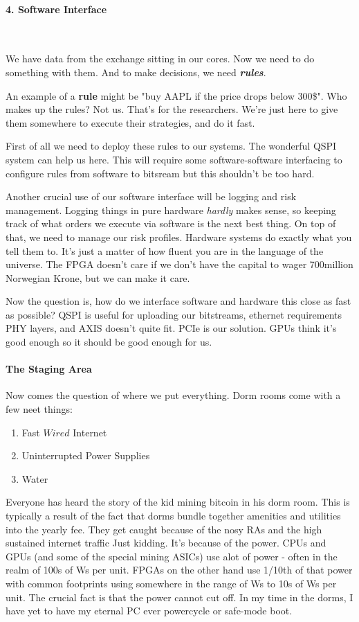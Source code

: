 \documentclass[12pt]{article}
\begin{document}
\paragraph {4. Software Interface}\

We have data from the exchange sitting in our cores. Now we need to do something with them. 
And to make decisions, we need \textbf{\emph{rules}}.

An example of a \textbf{rule} might be "buy AAPL if the price drops below 300\$". 
Who makes up the rules? Not us. That's for the researchers. We're just here to give them 
somewhere to execute their strategies, and do it fast.

First of all we need to deploy these rules to our systems. The wonderful QSPI system can help us here. 
This will require some software-software interfacing to configure rules from software to bitsream
but this shouldn't be too hard.


Another crucial use of our software interface will be logging and risk management.
Logging things in pure hardware \emph{hardly} makes sense, so keeping track of what 
orders we execute via software is the next best thing. 
On top of that, we need to manage our risk profiles. 
Hardware systems do exactly what you tell them to. It's just a matter of how fluent you are in the language of the universe.
The FPGA doesn't care if we don't have the capital to wager 700million Norwegian Krone, but we can make it care.

Now the question is, how do we interface software and hardware this close as fast as possible? 
QSPI is useful for uploading our bitstreams, ethernet requirements PHY layers, and AXIS doesn't quite fit. 
PCIe is our solution. GPUs think it's good enough so it should be good enough for us.

\paragraph{The Staging Area}

Now comes the question of where we put everything. 
Dorm rooms come with a few neet things:
\begin{enumerate}
  \item
    Fast \(Wired\) Internet
  \item
    Uninterrupted Power Supplies
  \item
    Water

\end{enumerate}
Everyone has heard the story of the kid mining bitcoin in his dorm room. 
This is typically a result of the fact that dorms bundle together amenities and utilities into the yearly fee.
They get caught because of the nosy RAs and the high sustained internet traffic 
Just kidding. It's because of the power. CPUs and GPUs (and some of the special mining ASICs) use alot of power -
often in the realm of 100s of Ws per unit. FPGAs on the other hand use 1/10th of that power with common footprints 
using somewhere in the range of Ws to 10s of Ws per unit. The crucial fact is that the power cannot cut off. 
In my time in the dorms, I have yet to have my eternal PC ever powercycle or safe-mode boot.
\end{document}
